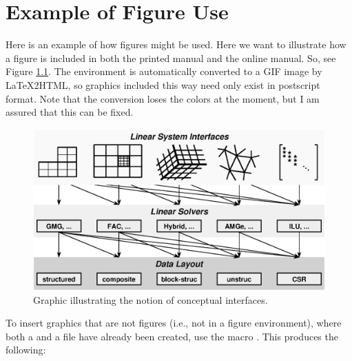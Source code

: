 \chapter{Example of Figure Use}
\label{Example of Figure Use}

Here is an example of how figures might be used.  Here we want to
illustrate how a figure is included in both the printed manual and the
online manual.  So, see Figure \ref{fig-conceptual-interface}.  The
 environment is automatically converted to a GIF image by
LaTeX2HTML, so graphics included this way need only exist in
postscript format.  Note that the conversion loses the colors at the
moment, but I am assured that this can be fixed.
\begin{figure}
\centering
\includegraphics[width=5in]{concep_iface.ps}
\caption{%
Graphic illustrating the notion of conceptual interfaces.}
\label{fig-conceptual-interface}
\end{figure}

To insert graphics that are not figures (i.e., not in a figure
environment), where both a  and a file have
already been created, use the macro .  This
produces the following:

\begin{center}
\end{center}
